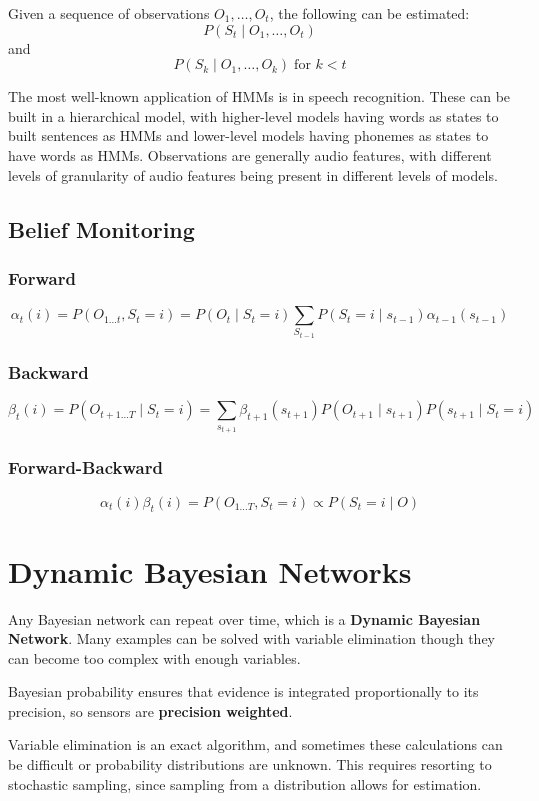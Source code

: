 \documentclass[11pt]{article}
\begin{document}
Given a sequence of observations \(O_{1}, \dots, O_{t}\), the following
can be estimated:
$$ P(S_{t} \mid O_{1}, \dots, O_{t}) $$
and
$$ P(S_{k} \mid O_{1}, \dots, O_{k}) \; \text{for $k < t$} $$

The most well-known application of HMMs is in speech recognition.
These can be built in a hierarchical model, with higher-level models
having words as states to built sentences as HMMs and lower-level
models having phonemes as states to have words as HMMs.
Observations are generally audio features, with different
levels of granularity of audio features being present in different
levels of models.
\subsection{Belief Monitoring}
\label{sec:org8924ad5}
\subsubsection{Forward}
\label{sec:org2f7ef85}
$$ \alpha_{t} (i) = P(O_{1 \dots t}, S_{t} = i) = P(O_{t} \mid S_{t} = i) \sum_{S_{t-1}} P(S_{t} = i \mid s_{t-1}) \alpha_{t-1}(s_{t-1}) $$
\subsubsection{Backward}
\label{sec:org1107c3f}
$$ \beta_{t}(i) = P(O_{t+1 \dots T} \mid S_{t} = i) = \sum_{s_{t+1}} \beta_{t+1} (s_{t+1}) P(O_{t+1} \mid s_{t+1}) P(s_{t+1} \mid S_{t} = i) $$
\subsubsection{Forward-Backward}
\label{sec:org0449f9c}
$$ \alpha_{t}(i) \beta_{t}(i) = P(O_{1 \dots T}, S_{t} = i) \propto P(S_{t} = i \mid O) $$
\section{Dynamic Bayesian Networks}
\label{sec:org1cc10ac}
Any Bayesian network can repeat over time, which is a \textbf{Dynamic Bayesian Network}.
Many examples can be solved with variable elimination though they can become too complex with
enough variables.

Bayesian probability ensures that evidence is integrated proportionally to its precision,
so sensors are \textbf{precision weighted}.

Variable elimination is an exact algorithm, and sometimes these calculations can be difficult
or probability distributions are unknown.
This requires resorting to stochastic sampling, since sampling from a distribution allows
for estimation.
\end{document}
